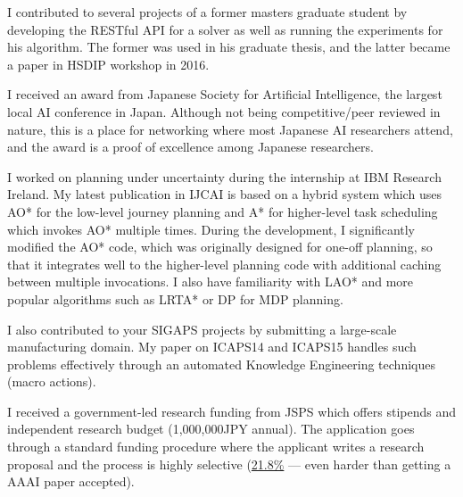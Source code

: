\documentclass[12pt]{letter}
\begin{document}
I contributed to several projects of a former masters graduate student
by developing the RESTful API for a solver as well as running the
experiments for his algorithm. The former was used in his graduate thesis,
and the latter became a paper in HSDIP workshop in 2016.

I received an award from Japanese Society for Artificial Intelligence,
the largest local AI conference in Japan.
Although not being competitive/peer reviewed in nature,
this is a place for networking where most Japanese AI researchers attend,
and the award is a proof of excellence among Japanese researchers.

I worked on planning under uncertainty during the internship at IBM Research Ireland.
My latest publication in IJCAI is based on a hybrid system which uses
AO* for the low-level journey planning and A* for higher-level task scheduling
which invokes AO* multiple times. 
During the development, I significantly modified the AO* code, which was originally designed for one-off planning,
so that it integrates well to the higher-level planning code with additional caching between multiple invocations.
I also have familiarity with LAO* and more popular algorithms such as LRTA* or DP for MDP planning.

I also contributed to your SIGAPS projects by submitting a large-scale
manufacturing domain. My paper on ICAPS14 and ICAPS15 handles such
problems effectively through an automated Knowledge Engineering
techniques (macro actions).

I received a government-led research funding from JSPS which offers
stipends and independent research budget (1,000,000JPY annual).
The application goes through a standard funding procedure where the applicant writes 
a research proposal and the process is highly selective (\href{aaa}{21.8\%} --- even harder than getting a AAAI paper accepted).



\end{document}
